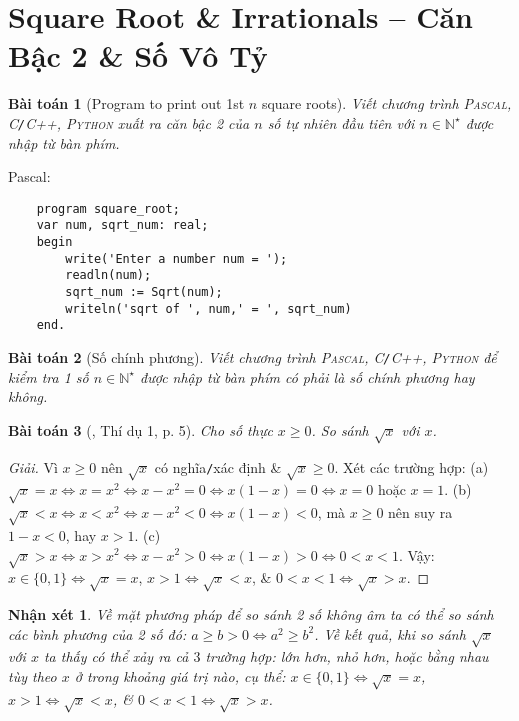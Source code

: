 \documentclass{article}
\newtheorem{baitoan}{Bài toán}
\newtheorem{nhanxet}{Nhận xét}
\begin{document}
\tableofcontents
\newpage


\section{Square Root \& Irrationals -- Căn Bậc 2 \& Số Vô Tỷ}

\begin{baitoan}[Program to print out 1st $n$ square roots]
	Viết chương trình \textsc{Pascal, C\texttt{/}C++, Python} xuất ra căn bậc 2 của $n$ số tự nhiên đầu tiên với $n\in\mathbb{N}^\star$ được nhập từ bàn phím.
\end{baitoan}
Pascal:
\begin{verbatim}
	program square_root;
	var num, sqrt_num: real;		
	begin
	    write('Enter a number num = ');
	    readln(num);
	    sqrt_num := Sqrt(num);
	    writeln('sqrt of ', num,' = ', sqrt_num)
	end.
\end{verbatim}

\begin{baitoan}[Số chính phương]
	Viết chương trình \textsc{Pascal, C\texttt{/}C++, Python} để kiểm tra 1 số $n\in\mathbb{N}^\star$ được nhập từ bàn phím có phải là số chính phương hay không.
\end{baitoan}

\begin{baitoan}[\cite{Tuyen_Toan_9}, Thí dụ 1, p. 5]
	Cho số thực $x\ge0$. So sánh $\sqrt{x}$ với $x$.
\end{baitoan}

\begin{proof}[Giải]
	Vì $x\ge0$ nên $\sqrt{x}$ có nghĩa\texttt{/}xác định \& $\sqrt{x}\ge0$. Xét các trường hợp: (a) $\sqrt{x} = x\Leftrightarrow x = x^2\Leftrightarrow x - x^2 = 0\Leftrightarrow x(1 - x) = 0\Leftrightarrow x = 0$ hoặc $x = 1$. (b) $\sqrt{x} < x\Leftrightarrow x < x^2\Leftrightarrow x - x^2 < 0\Leftrightarrow x(1 - x) < 0$, mà $x\ge0$ nên suy ra $1 - x < 0$, hay $x > 1$. (c) $\sqrt{x} > x\Leftrightarrow x > x^2\Leftrightarrow x - x^2 > 0\Leftrightarrow x(1 - x) > 0\Leftrightarrow 0 < x < 1$. Vậy: $x\in\{0,1\}\Leftrightarrow\sqrt{x} = x$, $x > 1\Leftrightarrow\sqrt{x} < x$, \& $0 < x < 1\Leftrightarrow\sqrt{x} > x$.
\end{proof}

\begin{nhanxet}
	Về mặt phương pháp để so sánh 2 số không âm ta có thể so sánh các bình phương của 2 số đó: $a\ge b > 0\Leftrightarrow a^2\ge b^2$. Về kết quả, khi so sánh $\sqrt{x}$ với $x$ ta thấy có thể xảy ra cả $3$ trường hợp: lớn hơn, nhỏ hơn, hoặc bằng nhau tùy theo $x$ ở trong khoảng giá trị nào, cụ thể: $x\in\{0,1\}\Leftrightarrow\sqrt{x} = x$, $x > 1\Leftrightarrow\sqrt{x} < x$, \& $0 < x < 1\Leftrightarrow\sqrt{x} > x$.
\end{nhanxet}
\end{document}
